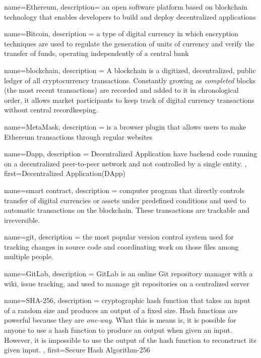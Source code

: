 
{
	name={Ethereum},
	description={
		an open software platform based on blockchain technology that enables developers to build and deploy decentralized applications
	}
}

{
	name={Bitcoin},
	description ={
		a type of digital currency in which encryption techniques are used to regulate the generation of units of currency and verify the transfer of funds, operating independently of a central bank
	}
}

{
	name={blockchain},
	description ={
		A blockchain is a digitized, decentralized, public ledger of all cryptocurrency transactions. Constantly growing as \textit{completed} blocks (the most recent transactions) are recorded and added to it in chronological order, it allows market participants to keep track of digital currency transactions without central recordkeeping.
	}
}

{
	name={MetaMask},
	description ={
		is a browser plugin that allows users to make Ethereum transactions through regular websites
	}
}


{
	name={Dapp},
	description ={
		Decentralized Application have backend code running on a decentralized peer-to-peer network and not controlled by a single entity.
	},
	first={Decentralized Application(DApp)}
}

{
	name={smart contract},
	description ={
		computer program that directly controls transfer of digital currencies or assets under predefined conditions and used to automatic transactions on the blockchain. These transactions are trackable and irreversible.
	}
}

{
	name={git},
	description ={
			the most popular version control system used for tracking changes in source code and coordinating work on those files among multiple people.
	}
}


{
	name={GitLab},
	description ={
		GitLab is an online Git repository manager with a wiki, issue tracking, and used to manage \gls{git} repositories on a centralized server
	}
}

{
	name={SHA-256},
	description ={
		cryptographic hash function that takes an input of a random size and produces an output of a fixed size. Hash functions are powerful because they are \textit{one-way}. What this is means is, it is possible for anyone to use a hash function to produce an output when given an input. However, it is impossible to use the output of the hash function to reconstruct its given input.
	},
	first={Secure Hash Algorithm-256}
}
